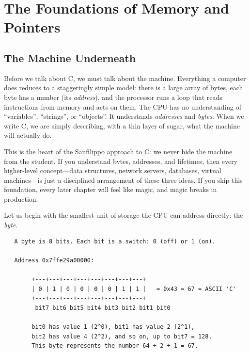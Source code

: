 
\chapter{The Foundations of Memory and Pointers}

\section{The Machine Underneath}

Before we talk about C, we must talk about the machine. Everything a
computer does reduces to a staggeringly simple model: there is a large
array of bytes, each byte has a number (its \emph{address}), and the
processor runs a loop that reads instructions from memory and acts on
them. The CPU has no understanding of ``variables'', ``strings'', or
``objects''. It understands \emph{addresses} and \emph{bytes}. When we
write C, we are simply describing, with a thin layer of sugar, what the
machine will actually do.

This is the heart of the Sanfilippo approach to C: we never hide the
machine from the student. If you understand bytes, addresses, and
lifetimes, then every higher-level concept---data structures, network
servers, databases, virtual machines---is just a disciplined arrangement
of these three ideas. If you skip this foundation, every later chapter
will feel like magic, and magic breaks in production.

Let us begin with the smallest unit of storage the CPU can address
directly: the \emph{byte}.

\begin{verbatim}
   A byte is 8 bits. Each bit is a switch: 0 (off) or 1 (on).

   Address 0x7ffe29a00000:

        +---+---+---+---+---+---+---+---+
        | 0 | 1 | 0 | 0 | 0 | 0 | 1 | 1 |   = 0x43 = 67 = ASCII 'C'
        +---+---+---+---+---+---+---+---+
         bit7 bit6 bit5 bit4 bit3 bit2 bit1 bit0

        bit0 has value 1 (2^0), bit1 has value 2 (2^1),
        bit2 has value 4 (2^2), and so on, up to bit7 = 128.
        This byte represents the number 64 + 2 + 1 = 67.
\end{verbatim}

